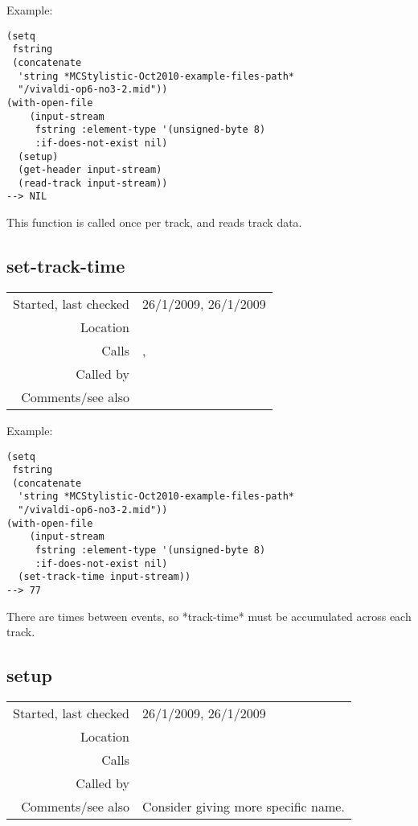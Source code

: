 \vspace{0.5cm}
\noindent Example:
\begin{verbatim}
(setq
 fstring
 (concatenate
  'string *MCStylistic-Oct2010-example-files-path*
  "/vivaldi-op6-no3-2.mid"))
(with-open-file
    (input-stream
     fstring :element-type '(unsigned-byte 8)
     :if-does-not-exist nil)
  (setup)
  (get-header input-stream)
  (read-track input-stream))
--> NIL
\end{verbatim}

\noindent This function is called once per track,
and reads track data.


\subsection*{set-track-time}\label{fun:set-track-time}

\vspace{0.3cm}
\begin{tabular}{r|p{8cm}}
Started, last checked & 26/1/2009, 26/1/2009 \\
Location & \nameref{sec:MIDI-import} \\
Calls & \nameref{fun:convert-vlq}, \nameref{fun:get-vlq} \\
Called by & \nameref{fun:read-track} \\
Comments/see also &
\end{tabular}

\vspace{0.5cm}
\noindent Example:
\begin{verbatim}
(setq
 fstring
 (concatenate
  'string *MCStylistic-Oct2010-example-files-path*
  "/vivaldi-op6-no3-2.mid"))
(with-open-file
    (input-stream
     fstring :element-type '(unsigned-byte 8)
     :if-does-not-exist nil)
  (set-track-time input-stream))
--> 77
\end{verbatim}

\noindent There are times between events, so
*track-time* must be accumulated across each track.


\subsection*{setup}\label{fun:setup}

\vspace{0.3cm}
\begin{tabular}{r|p{8cm}}
Started, last checked & 26/1/2009, 26/1/2009 \\
Location & \nameref{sec:MIDI-import} \\
Calls & \\
Called by & \nameref{fun:load-midi-file} \\
Comments/see also & Consider giving more specific name.
\end{tabular}

